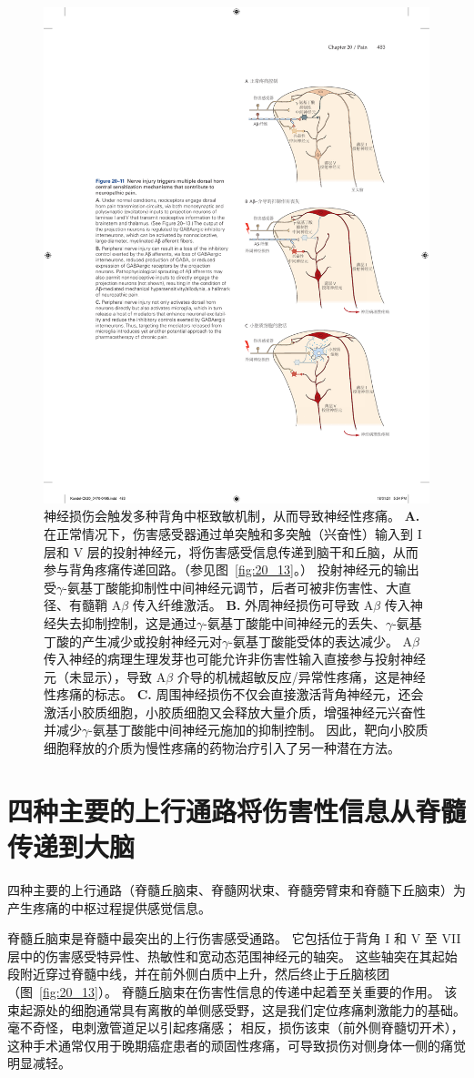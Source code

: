 \begin{figure}[htbp]
	\centering
	\includegraphics[width=0.55\linewidth]{chap20/fig_20_11}
	\caption{神经损伤会触发多种背角中枢致敏机制，从而导致神经性疼痛。
		\textbf{A.} 在正常情况下，伤害感受器通过单突触和多突触（兴奋性）输入到 I 层和 V 层的投射神经元，将伤害感受信息传递到脑干和丘脑，从而参与背角疼痛传递回路。（参见图~\ref{fig:20_13}。）
		投射神经元的输出受$\gamma$-氨基丁酸能抑制性中间神经元调节，后者可被非伤害性、大直径、有髓鞘 A$ \beta $ 传入纤维激活。
		\textbf{B.} 外周神经损伤可导致 A$ \beta $ 传入神经失去抑制控制，这是通过$\gamma$-氨基丁酸能中间神经元的丢失、$\gamma$-氨基丁酸的产生减少或投射神经元对$\gamma$-氨基丁酸能受体的表达减少。
		A$ \beta $ 传入神经的病理生理发芽也可能允许非伤害性输入直接参与投射神经元（未显示），导致 A$ \beta $ 介导的机械超敏反应/异常性疼痛，这是神经性疼痛的标志。
		\textbf{C.} 周围神经损伤不仅会直接激活背角神经元，还会激活小胶质细胞，小胶质细胞又会释放大量介质，增强神经元兴奋性并减少$\gamma$-氨基丁酸能中间神经元施加的抑制控制。
		因此，靶向小胶质细胞释放的介质为慢性疼痛的药物治疗引入了另一种潜在方法。}
	\label{fig:20_11}
\end{figure}



\section{四种主要的上行通路将伤害性信息从脊髓传递到大脑}

四种主要的上行通路（脊髓丘脑束、脊髓网状束、脊髓旁臂束和脊髓下丘脑束）为产生疼痛的中枢过程提供感觉信息。


脊髓丘脑束是脊髓中最突出的上行伤害感受通路。
它包括位于背角 I 和 V 至 VII 层中的伤害感受特异性、热敏性和宽动态范围神经元的轴突。
这些轴突在其起始段附近穿过脊髓中线，并在前外侧白质中上升，然后终止于丘脑核团（图~\ref{fig:20_13}）。
脊髓丘脑束在伤害性信息的传递中起着至关重要的作用。 
该束起源处的细胞通常具有离散的单侧感受野，这是我们定位疼痛刺激能力的基础。
毫不奇怪，电刺激管道足以引起疼痛感；
相反，损伤该束（前外侧脊髓切开术），这种手术通常仅用于晚期癌症患者的顽固性疼痛，可导致损伤对侧身体一侧的痛觉明显减轻。


